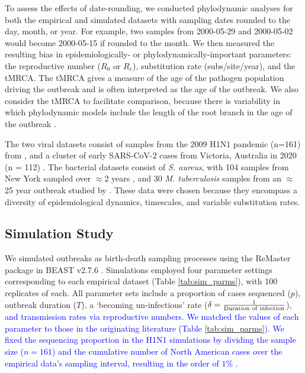 \documentclass[12pt]{article}
\begin{document}
\begin{spacing}{2}
To assess the effects of date-rounding, we conducted phylodynamic analyses for both the empirical and simulated datasets with sampling dates rounded to the day, month, or year. For example, two samples from 2000-05-29 and 2000-05-02 would become 2000-05-15 if rounded to the month. We then measured the resulting bias in epidemiologically- or phylodynamically-important parameters: the reproductive number ($R_0$ or $R_e$), substitution rate (subs/site/year), and the tMRCA. The tMRCA gives a measure of the age of the pathogen population driving the outbreak and is often interpreted as the age of the outbreak. We also consider the tMRCA to facilitate comparison, because there is variability in which phylodynamic models include the length of the root branch in the age of the outbreak \citep{stadler2012estimating}.

The two viral datasets consist of samples from the 2009 H1N1 pandemic (n=161) from \citet{hedge_2013_real-time}, and a cluster of early SARS-CoV-2 cases from  Victoria, Australia in 2020 (n = 112) \citep{lane2021genomics}. The bacterial datasets consist of \textit{S. aureus}, with 104 samples from New York sampled over $\approx$2 years \citep{duchene_2016_genome,volz_modeling_2018,uhlemann_molecular_2014}, and 30 \textit{M. tuberculosis} samples from an $\approx$25 year outbreak studied by \citet{kuhnert_tuberculosis_2018}. These data were chosen because they encompass a diversity of epidemiological dynamics, timescales, and variable substitution rates.

\subsection*{Simulation Study}
We simulated outbreaks as birth-death sampling processes using the ReMaster package in BEAST v2.7.6 \citep{vaughan_remaster_2024,bouckaert_beast_2019}. Simulations employed four parameter settings corresponding to each empirical dataset (Table \ref{tab:sim_parms}), with 100 replicates of each. All parameter sets include a proportion of cases sequenced ($p$), outbreak duration ($T$), a `becoming un-infectious' rate ($\delta = \frac{1}{\textnormal{Duration of infection}}$)\textcolor{blue}{, and transmission rates via reproductive numbers. We matched the values of each parameter to those in the originating literature (Table \ref{tab:sim_parms}). We fixed the sequencing proportion in the H1N1 simulations by dividing the sample size ($n=161$) and the cumulative number of North American cases over the empirical data's sampling interval, resulting in the order of $1\%$ \citep{jhung_epidemiology_2011}.}


\end{spacing}
\end{document}

